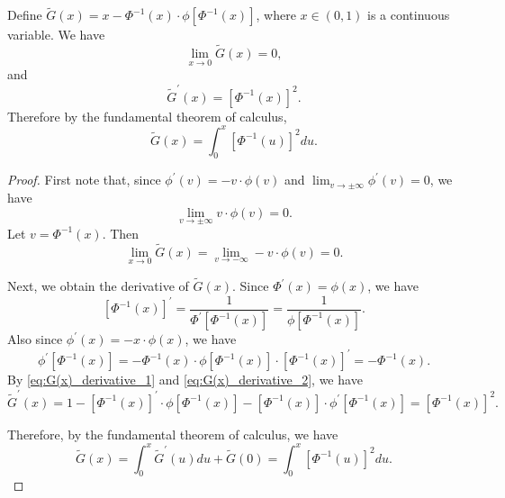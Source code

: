 \begin{lemma}
	\label{lemma:G(x)}
	Define $\tilde{G}(x)=  x-\Phi^{-1}(x)\cdot \phi \left[\Phi^{-1}(x)\right]$, where $x\in (0,1)$ is a continuous variable. We have
	\begin{equation*}
	\lim_{x\to 0} \tilde{G}(x) = 0,
	\end{equation*}
	and 
	\begin{equation*}
	\tilde{G}^\prime(x) = \left[\Phi^{-1}(x)\right]^2.
	\end{equation*}
	Therefore by the fundamental theorem of calculus,
	\begin{equation*}
	\tilde{G}(x) = \int_{0}^{x} \left[\Phi^{-1}(u)\right]^2 du.
	\end{equation*}
\end{lemma}
\begin{proof}
	First note that, since $\phi^\prime(v)= -v\cdot \phi(v)$ and $\lim_{v\to \pm \infty} \phi^\prime(v) =0$, we have
	\begin{equation*}
	\lim_{v\to \pm \infty} v \cdot \phi(v) = 0.
	\end{equation*}
	Let $v=\Phi^{-1}(x)$. Then
	\begin{equation*}
	\lim_{x\to 0} \tilde{G}(x)  = \lim_{v\to -\infty} -v \cdot \phi(v) = 0.
	\end{equation*}
	\iffalse
	and 
	\begin{equation}
	\lim_{x\to 1} \tilde{G}(x)  = 1- \lim_{v\to \infty} v \cdot \phi(v) = 1,
	\end{equation}
	\fi
	
	Next, we obtain the derivative of $\tilde{G}(x)$. Since $\Phi^\prime(x) = \phi(x)$, we have
	\begin{equation}
	\left[\Phi^{-1}(x)\right]^\prime = \frac{1}{\Phi^\prime \left[\Phi^{-1}(x)\right]}=\frac{1}{\phi \left[\Phi^{-1}(x)\right]}.
	\label{eq:G(x)_derivative_1}
	\end{equation}
	Also since $\phi^\prime(x) = -x\cdot \phi(x)$, we have
	\begin{equation}
	\phi^\prime\left[\Phi^{-1}(x)\right] = - \Phi^{-1}(x) \cdot \phi\left[\Phi^{-1}(x)\right] \cdot \left[\Phi^{-1}(x)\right]^\prime = -\Phi^{-1}(x).
	\label{eq:G(x)_derivative_2}
	\end{equation}
	By \eqref{eq:G(x)_derivative_1} and \eqref{eq:G(x)_derivative_2}, we have
	\begin{equation*}
	\tilde{G}^\prime(x) = 1 - \left[\Phi^{-1}(x)\right]^\prime \cdot  \phi\left[\Phi^{-1}(x)\right] - \left[\Phi^{-1}(x)\right] \cdot \phi^\prime\left[\Phi^{-1}(x)\right] =  \left[\Phi^{-1}(x)\right]^2.
	\end{equation*}
	
	Therefore, by the fundamental theorem of calculus, we have
	\begin{equation*}
	\tilde{G}(x) = \int_{0}^{x} \tilde{G}^\prime(u) du + \tilde{G}(0) = \int_{0}^{x} \left[\Phi^{-1}(u)\right]^2 du.
	\end{equation*}
\end{proof}


